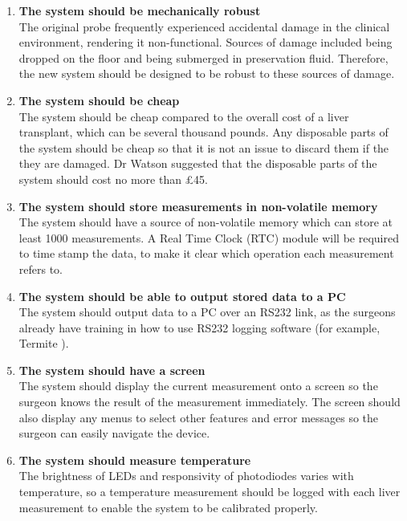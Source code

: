 \begin{enumerate}
\item \textbf{The system should be mechanically robust}\\
The original probe frequently experienced accidental damage in the clinical environment, rendering it non-functional. Sources of damage included being dropped on the floor and being submerged in preservation fluid. Therefore, the new system should be designed to be robust to these sources of damage.

\item \textbf{The system should be cheap}\\
The system should be cheap compared to the overall cost of a liver transplant, which can be several thousand pounds. Any disposable parts of the system should be cheap so that it is not an issue to discard them if the they are damaged. Dr Watson suggested that the disposable parts of the system should cost no more than £45.

\item \textbf{The system should store measurements in non-volatile memory}\\
The system should have a source of non-volatile memory which can store at least 1000 measurements. A Real Time Clock (RTC) module will be required to time stamp the data, to make it clear which operation each measurement refers to.

\item \textbf{The system should be able to output stored data to a PC}\\
The system should output data to a PC over an RS232 link, as the surgeons already have training in how to use RS232 logging software (for example, Termite \cite{termite}).

\item \textbf{The system should have a screen}\\
The system should display the current measurement onto a screen so the surgeon knows the result of the measurement immediately. The screen should also display any menus to select other features and error messages so the surgeon can easily navigate the device.

\item \textbf{The system should measure temperature}\\
The brightness of LEDs and responsivity of photodiodes varies with temperature, so a temperature measurement should be logged with each liver measurement to enable the system to be calibrated properly.




\end{enumerate}